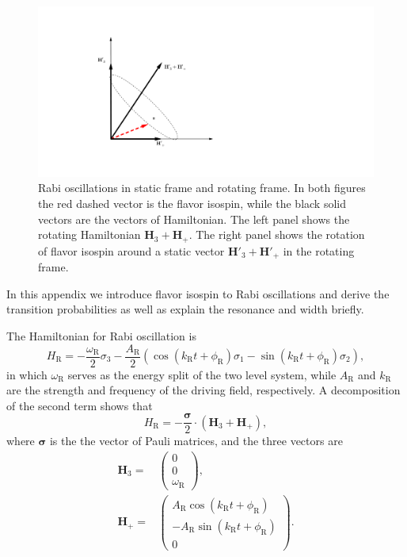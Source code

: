 \documentclass[%
reprint,
 amsmath,amssymb,
 prd,
]{revtex4-1}
\begin{document}
\begin{figure}
        \centering
        \includegraphics[width=\columnwidth, trim={20cm 10cm 50cm 10cm},clip]{assets/rabi-isospin-rotating-frame}
    \caption{Rabi oscillations in static frame and rotating frame. In both figures the red dashed vector is the flavor isospin, while the black solid vectors are the vectors of Hamiltonian. The left panel shows the rotating Hamiltonian $\mathbf{H}_3+\mathbf{H}_+$. The right panel shows the rotation of flavor isospin around a static vector $\mathbf{H}'_3+\mathbf{H}'_+$ in the rotating frame.}
    \label{fig-rabi-isospin-rotating-frame}
\end{figure}

In this appendix we introduce flavor isospin \cite{Duan2006a} to Rabi oscillations and derive the transition probabilities as well as explain the resonance and width briefly.


The Hamiltonian for Rabi oscillation is
\begin{equation}
    H_{\mathrm R} = -\frac{\omega_{\mathrm R}}{2}\sigma_3 - \frac{A_{\mathrm{R}} }{2}  \left( \cos(k_{\mathrm{R}} t +\phi_{\mathrm{R}})\sigma_1  - \sin(k_{\mathrm{R}} t +\phi_{\mathrm{R}}) \sigma_2\right),
    \label{rabi-oscillation-single-perturbation}
\end{equation}
in which $\omega_{\mathrm R}$ serves as the energy split of the two level system, while $A_{\mathrm{R}}$ and $k_{\mathrm{R}}$ are the strength and frequency of the driving field, respectively. A decomposition of the second term shows that
\begin{equation*}
H_{\mathrm R} 
= - \frac{\boldsymbol{\sigma}}{2} \cdot (\mathbf{H}_3 + \mathbf{H}_+ ) ,
\end{equation*}
where $\boldsymbol{\sigma}$ is the the vector of Pauli matrices, and the three vectors are
\begin{align}
    \mathbf{H}_3 = & \begin{pmatrix}
    0 \\ 0 \\ \omega_{\mathrm R}
    \end{pmatrix}, \\
    \mathbf{H}_+ = & \begin{pmatrix}
    A_{\mathrm{R}} \cos(k_{\mathrm{R}} t +\phi_{\mathrm{R}}) \\
    - A_{\mathrm{R}} \sin(k_{\mathrm{R}} t +\phi_{\mathrm{R}}) \\
    0
    \end{pmatrix}.
\end{align}
\end{document}
